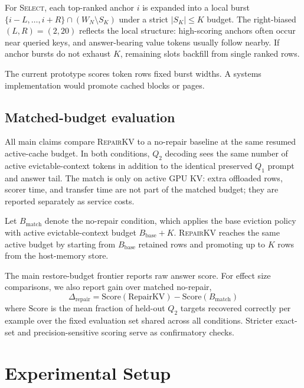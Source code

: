 \documentclass{article}
\newcommand{\repairkv}{\textsc{RepairKV}}
\newcommand{\bbase}{\ensuremath{B_{\mathrm{base}}}}
\newcommand{\bmatch}{\ensuremath{B_{\mathrm{match}}}}
\begin{document}
For \textsc{Select}, each top-ranked anchor $i$ is
expanded into a local burst $\{i{-}L,\dots,i{+}R\} \cap (W_N \setminus
S_K)$ under a strict $|S_K| \le K$ budget. The right-biased
$(L, R) = (2, 20)$ {\color{red}reflects the local structure: high-scoring anchors often occur near queried keys, and answer-bearing value tokens usually follow nearby.} If anchor bursts do not exhaust $K$,
remaining slots backfill from single ranked rows.

The current prototype scores token rows {\color{red}fixed burst widths}. A systems implementation would promote cached blocks or pages.

\subsection{Matched-budget evaluation}
All main claims compare \repairkv{} to a no-repair baseline at the same
resumed active-cache budget. {\color{red}In both conditions, $Q_2$ decoding sees the same number} of active evictable-context tokens in addition to the
identical preserved $Q_1$ prompt and answer tail. The match is only on active GPU KV: extra offloaded rows, scorer time, and transfer time are not part of the matched budget; they are reported separately as service costs.

{\color{red}Let $\bmatch$ denote the no-repair condition, which applies the base eviction policy with active evictable-context budget $\bbase+K$. \repairkv{} reaches the same active budget by starting from $\bbase$ retained rows and promoting up to $K$ rows from the host-memory store.

The main restore-budget frontier reports raw answer score. For effect size comparisons, we also report gain over matched no-repair,
\begin{equation}
  \Delta_{\mathrm{repair}} =
  \mathrm{Score}(\mathrm{RepairKV}) - \mathrm{Score}(B_{\mathrm{match}})
\end{equation}
where $\mathrm{Score}$ is the mean fraction of held-out $Q_2$ targets recovered correctly per example over the fixed evaluation set shared across all conditions. Stricter exact-set and precision-sensitive scoring serve as confirmatory checks.}

\section{Experimental Setup}
\label{sec:setup}
\end{document}
